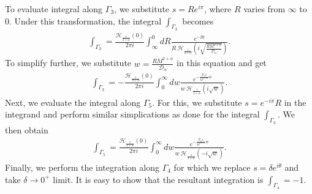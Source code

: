 \documentclass[superscriptaddress,amsmath,amssymb,aps,onecolumn]{revtex4}
\begin{document}
To evaluate integral along $\Gamma _3$, we substitute $s = R e^{i \pi}$, where $R$ varies from $\infty$ to $0$. Under this transformation, the integral $\int _{\Gamma _3}$ becomes
\begin{align}
\int _{\Gamma _3} = \frac{\mathcal{H}_{\frac{1}{2+\alpha}} \left(0 \right)}{2 \pi i} \int _{\infty}^{0} dR \frac{e^{-Rt}}{R ~\mathcal{H}_{\frac{1}{2+\alpha}} \left( i\sqrt{\frac{R M^{2+\alpha}}{\mathcal{D}_{\alpha}}}  \right)}.
\label{appen-ILT-J-Eq-2}
\end{align}
To simplify further, we substitute $w = \frac{R M^{2+\alpha}}{\mathcal{D}_{\alpha}}$ in this equation and get
\begin{align}
\int _{\Gamma _3} = -\frac{\mathcal{H}_{\frac{1}{2+\alpha}} \left(0 \right)}{2 \pi i} \int _{0}^{\infty} dw \frac{e^{-\frac{\mathcal{D}_{\alpha} t}{M^{2+\alpha}}w}}{w ~\mathcal{H}_{\frac{1}{2+\alpha}} \left( i \sqrt{w} \right)}.
\label{appen-ILT-J-Eq-3}
\end{align}
Next, we evaluate the integral along $\Gamma _5$. For this, we substitute $s = e^{-i \pi} R$ in the integrand and perform similar simplications as done for the integral $\int _{\Gamma _3}$. We then obtain
\begin{align}
\int _{\Gamma _5} = \frac{\mathcal{H}_{\frac{1}{2+\alpha}} \left(0 \right)}{2 \pi i} \int _{0}^{\infty} dw \frac{e^{-\frac{\mathcal{D}_{\alpha} t}{M^{2+\alpha}}w}}{w ~\mathcal{H}_{\frac{1}{2+\alpha}} \left( -i \sqrt{w} \right)}.
\label{appen-ILT-J-Eq-4}
\end{align}
Finally, we perform the integration along $\Gamma _4$ for which we replace $s=\delta e^{i \theta}$ and take $\delta \to 0^+$ limit. It is easy to show that the resultant integration is $\int _{\Gamma _4} = -1$.
\end{document}
